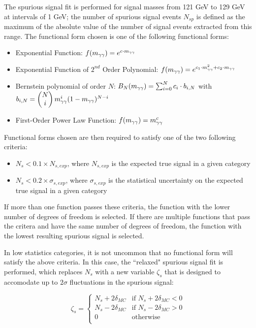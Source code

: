 The spurious signal fit is performed for signal masses from 121 GeV to 129 GeV at intervals of 1 GeV; the number of spurious signal events $N_{sp}$ is defined as the maximum of the absolute value of the number of signal events extracted from this range. The functional form chosen is one of the following functional forms:

\begin{itemize}
\item Exponential Function: $f(m_{\gamma\gamma}) = e^{c\cdot m_{\gamma\gamma}}$
\item Exponential Function of $2^{nd}$ Order Polynomial: $f(m_{\gamma\gamma}) = e^{c_1\cdot m^2_{\gamma\gamma}+c_2\cdot m_{\gamma\gamma}}$
\item Bernstein polynomial of order $N$: $B_{N}(m_{\gamma\gamma}) = \sum_{i=0}^N c_i\cdot b_{i,N}$ with ${b_{i,N} = \begin{pmatrix}N\\i\end{pmatrix}m_{\gamma\gamma}^i (1-m_{\gamma\gamma})^{N-i}}$
\item First-Order Power Law Function: $f(m_{\gamma\gamma}) = m_{\gamma\gamma}^c$
\end{itemize}

Functional forms chosen are then required to satisfy one of the two following criteria:

\begin{itemize}
\item $N_{s} < 0.1 \times N_{s,exp}$, where $N_{s,exp}$ is the expected true signal in a given category
\item $N_{s} < 0.2 \times \sigma_{s,exp}$, where $\sigma_{s,exp}$ is the statistical uncertainty on the expected true signal in a given category
\end{itemize}

If more than one function passes these criteria, the function with the lower number of degrees of freedom is selected. If there are multiple functions that pass the critera and have the same number of degrees of freedom, the function with the lowest resulting spurious signal is selected.

In low statistics categories, it is not uncommon that no functional form will satisfy the above criteria. In this case, the ``relaxed" spurious signal fit is performed, which replaces $N_{s}$ with a new variable $\zeta_{s}$ that is designed to accomodate up to $2\sigma$ fluctuations in the spurious signal:

\[\zeta_{s} = \begin{cases} 
      N_{s} + 2 \delta_{MC} & \mbox{if }  N_{s} + 2 \delta_{MC} < 0\\
      N_{s} - 2 \delta_{MC} & \mbox{if }  N_{s} - 2 \delta_{MC} > 0\\
      0 & \mbox{otherwise } \\
   \end{cases}
\]

